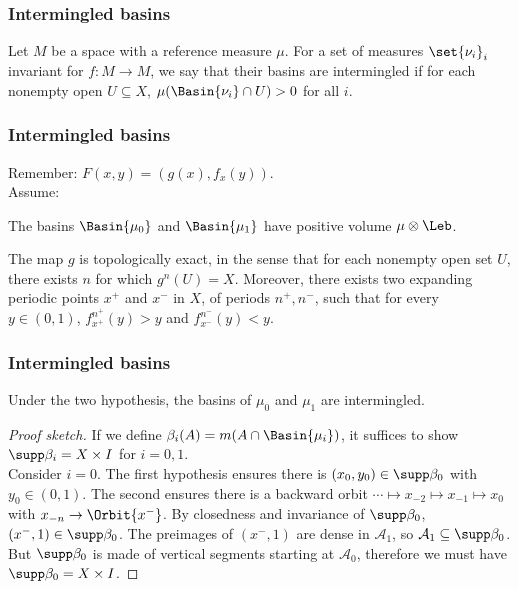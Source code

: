 \documentclass[shortlabels, 9pt, aspectratio=2013]{beamer}
\begin{document}
\begin{frame}
  \frametitle{Intermingled basins}
  \begin{definition}
    Let \(M\) be a space with a reference measure \(\mu\). For a set of measures \(\set{\nu_i}_i\) invariant for \(f \colon M \to M\), we say that their basins are intermingled if for each nonempty open \(U \subseteq X\), \(\mu(\Basin{\nu_i} \cap U) > 0\) for all \(i\).
  \end{definition}
\end{frame}
\begin{frame}
  \frametitle{Intermingled basins}
  Remember: \(F(x,y) = (g(x),f_x(y))\).\\[1em]
  Assume:
  \begin{hypothesis}\label{hip:basins-support-nonempty}
    The basins \(\Basin{\mu_{0}}\) and \(\Basin{\mu_{1}}\) have positive volume \(\mu \otimes \Leb\).
  \end{hypothesis}

  \begin{hypothesis}\label{hip:elevators}
    The map \(g\) is topologically exact, in the sense that for each nonempty open set \(U\), there exists \(n\) for which \(g^n(U) = X\). Moreover, there exists two expanding periodic points \(x^+\) and \(x^-\) in \(X\), of periods \(n^+, n^-\), such that for every \(y \in (0,1)\), \(f_{x^+}^{n^+}(y) > y\) and \(f_{x^-}^{n^-}(y) < y\).
  \end{hypothesis}
\end{frame}

\begin{frame}
  \frametitle{Intermingled basins}
  \begin{theorem}
    Under the two hypothesis, the basins of \(\mu_0\) and \(\mu_1\) are intermingled.
  \end{theorem}
  \begin{proof}[Proof sketch]
    If we define \(\beta_i(A) = m(A \cap \Basin{\mu_i})\), it suffices to show \(\supp \beta_i = X \times I\) for \(i = 0,1\).\\[1em]

    Consider \(i = 0\). The first hypothesis ensures there is \((x_0,y_0) \in \supp \beta_0\) with \(y_0 \in (0,1)\). The second ensures there is a backward orbit \(\cdots \mapsto x_{-2} \mapsto x_{-1} \mapsto x_0\) with \(x_{-n}\to \Orbit{x^-}\). By closedness and invariance of \(\supp \beta_0\), \((x^-, 1) \in \supp \beta_0\). The preimages of \((x^-, 1)\) are dense in \(\mathcal{A}_1\), so \(\mathcal{A}_1 \subseteq \supp \beta_0\). But \(\supp \beta_0\) is made of vertical segments starting at \(\mathcal{A}_0\), therefore we must have \(\supp \beta_0 = X \times I\).
  \end{proof}
\end{frame}
\end{document}

